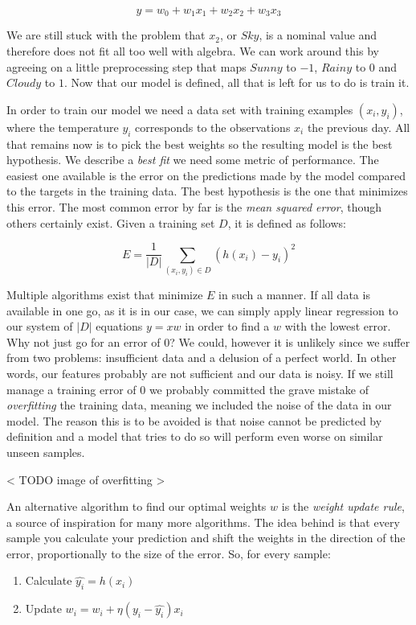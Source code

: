 $$ y = w_0 + w_1x_1 + w_2x_2 + w_3x_3 $$

We are still stuck with the problem that $x_2$, or $Sky$,
is a nominal value and therefore does not fit all too well with algebra.
We can work around this by agreeing on
a little preprocessing step
that maps $Sunny$ to $-1$, $Rainy$ to $0$ and $Cloudy$ to $1$.
Now that our model is defined, all that is left for us to do
is train it.

In order to train our model we need a data set with training examples
$(x_i, y_i)$,
where the temperature $y_i$ corresponds to
the observations $x_i$ the previous day.
All that remains now is to pick the best weights
so the resulting model is the best hypothesis.
We describe a \textit{best fit}
we need some metric of performance.
The easiest one available is the error on the predictions made by the model
compared to the targets in the training data.
The best hypothesis is the one that minimizes this error.
The most common error by far is the \textit{mean squared error},
though others certainly exist.
Given a training set $D$, it is defined as follows:

$$ E = \frac{1}{|D|} \sum_{(x_i, y_i) \in D}{(h(x_i) - y_i)^2} $$

Multiple algorithms exist that minimize $E$ in such a manner.
If all data is available in one go, as it is in our case,
we can simply apply linear regression to our system
of $|D|$ equations $y = xw$ in order to find a $w$
with the lowest error.
Why not just go for an error of $0$?
We could, however it is unlikely since we suffer from two problems:
insufficient data and a delusion of a perfect world.
In other words, our features probably are not sufficient
and our data is noisy.
If we still manage a training error of $0$
we probably committed the grave mistake of
\textit{overfitting} the training data,
meaning we included the noise of the data in our model.
The reason this is to be avoided is that noise
cannot be predicted by definition and a model that tries
to do so will perform even worse on similar unseen samples.

< TODO image of overfitting >

An alternative algorithm to find our optimal weights $w$
is the \textit{weight update rule},
a source of inspiration for many more algorithms.
The idea behind is that every sample
you calculate your prediction
and shift the weights in the direction of the error,
proportionally to the size of the error.
So, for every sample:
\begin{enumerate}
\item Calculate $\hat{y_i} = h(x_i)$
\item Update $w_i = w_i + \eta(y_i - \hat{y_i})x_i$
\end{enumerate}

